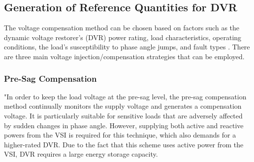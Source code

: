 \subsection {Generation of Reference Quantities for DVR}
The voltage compensation method can be chosen based on factors such as the dynamic voltage restorer's (DVR) power rating, load characteristics, operating conditions, the load's susceptibility to phase angle jumps, and fault types \cite{DVR}. There are three main voltage injection/compensation strategies that can be employed.  
\vspace*{-.5cm}
\subsubsection{Pre-Sag Compensation} \vspace*{-.5cm}
"In order to keep the load voltage at the pre-sag level, the pre-sag compensation method continually monitors the supply voltage and generates a compensation voltage. It is particularly suitable for sensitive loads that are adversely affected by sudden changes in phase angle. However, supplying both active and reactive powers from the VSI is required for this technique, which also demands for a higher-rated DVR. Due to the fact that this scheme uses active power from the VSI, DVR requires a large energy storage capacity. 

